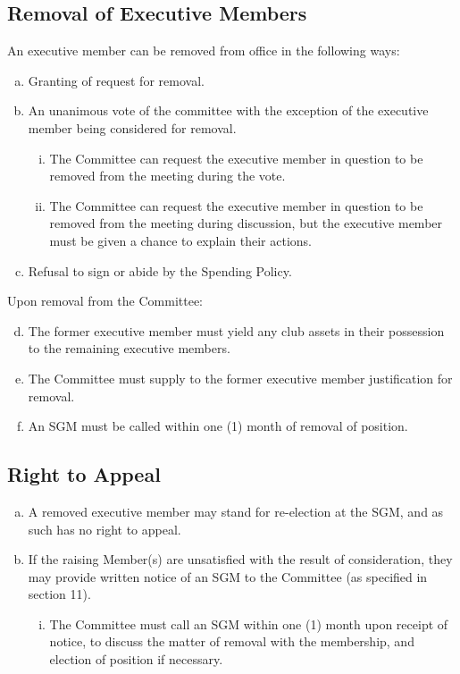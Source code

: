 \documentclass[a4paper,12pt]{article}
\begin{document}
\subsection{Removal of Executive Members}

An executive member can be removed from office in the following ways:

\begin{enumerate}[a)]
	\item Granting of request for removal.
	\item An unanimous vote of the committee with the exception of the executive member being considered for removal.
	\begin{enumerate}[i)]
		\item The Committee can request the executive member in question to be removed from the meeting during the vote.
		\item The Committee can request the executive member in question to be removed from the meeting during discussion, but the executive member must be given a chance to explain their actions.
	\end{enumerate}
	\item Refusal to sign or abide by the Spending Policy.
\end{enumerate}

Upon removal from the Committee:

\begin{enumerate}[a)]
	\setcounter{enumi}{3}
	\item The former executive member must yield any club assets in their possession to the remaining executive members.
	\item The Committee must supply to the former executive member justification for removal.
	\item An SGM must be called within one (1) month of removal of position.
\end{enumerate}

\subsection{Right to Appeal}

\begin{enumerate}[a)]
	\item A removed executive member may stand for re-election at the SGM, and as such has no right to appeal.
	\item If the raising Member(s) are unsatisfied with the result of consideration, they may provide written notice of an SGM to the Committee (as specified in section 11).
	\begin{enumerate}[i)]
		\item The Committee must call an SGM within one (1) month upon receipt of notice, to discuss the matter of removal with the membership, and election of position if necessary.
	\end{enumerate}
\end{enumerate}
\end{document}
